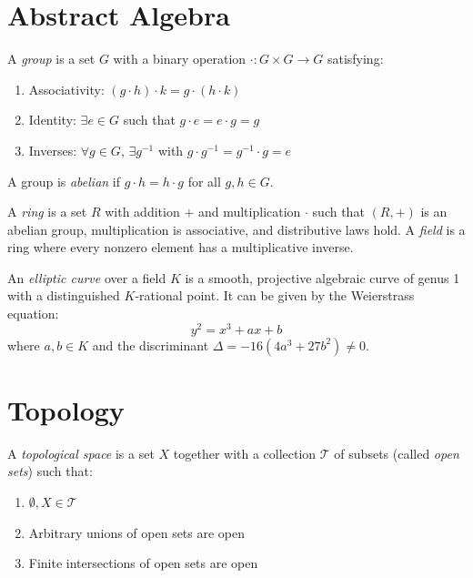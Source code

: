 \section{Abstract Algebra}

\begin{definition}
A \textit{group} is a set $G$ with a binary operation $\cdot: G \times G \to G$ satisfying:
\begin{enumerate}
  \item Associativity: $(g \cdot h) \cdot k = g \cdot (h \cdot k)$
  \item Identity: $\exists e \in G$ such that $g \cdot e = e \cdot g = g$
  \item Inverses: $\forall g \in G$, $\exists g^{-1}$ with $g \cdot g^{-1} = g^{-1} \cdot g = e$
\end{enumerate}
A group is \textit{abelian} if $g \cdot h = h \cdot g$ for all $g, h \in G$.
\end{definition}

\begin{definition}
A \textit{ring} is a set $R$ with addition $+$ and multiplication $\cdot$ such that $(R, +)$ is an abelian group, multiplication is associative, and distributive laws hold. A \textit{field} is a ring where every nonzero element has a multiplicative inverse.
\end{definition}

\begin{definition}
An \textit{elliptic curve} over a field $K$ is a smooth, projective algebraic curve of genus 1 with a distinguished $K$-rational point. It can be given by the Weierstrass equation:
\[
y^2 = x^3 + ax + b
\]
where $a, b \in K$ and the discriminant $\Delta = -16(4a^3 + 27b^2) \neq 0$.
\end{definition}

\section{Topology}

\begin{definition}
A \textit{topological space} is a set $X$ together with a collection $\mathcal{T}$ of subsets (called \textit{open sets}) such that:
\begin{enumerate}
  \item $\emptyset, X \in \mathcal{T}$
  \item Arbitrary unions of open sets are open
  \item Finite intersections of open sets are open
\end{enumerate}
\end{definition}

